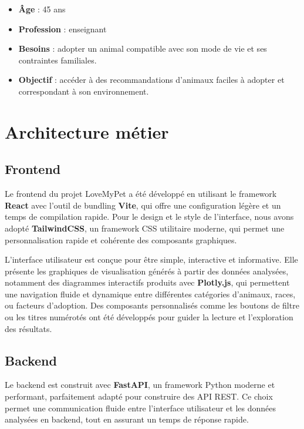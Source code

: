 \documentclass[a4paper,12pt]{article}
\begin{document}
\begin{itemize}
    \item \textbf{Âge} : 45 ans
    \item \textbf{Profession} : enseignant
    \item \textbf{Besoins} : adopter un animal compatible avec son mode de vie et ses contraintes familiales.
    \item \textbf{Objectif} : accéder à des recommandations d’animaux faciles à adopter et correspondant à son environnement.
\end{itemize}

\section {Architecture métier}

\subsection {Frontend}

Le frontend du projet LoveMyPet a été développé en utilisant le framework \textbf{React} avec l’outil de bundling \textbf{Vite}, qui offre une configuration légère et un temps de compilation rapide. Pour le design et le style de l’interface, nous avons adopté \textbf{TailwindCSS}, un framework CSS utilitaire moderne, qui permet une personnalisation rapide et cohérente des composants graphiques.

L’interface utilisateur est conçue pour être simple, interactive et informative. Elle présente les graphiques de visualisation générés à partir des données analysées, notamment des diagrammes interactifs produits avec \textbf{Plotly.js}, qui permettent une navigation fluide et dynamique entre différentes catégories d’animaux, races, ou facteurs d’adoption. Des composants personnalisés comme les boutons de filtre ou les titres numérotés ont été développés pour guider la lecture et l’exploration des résultats.

\subsection {Backend}

Le backend est construit avec \textbf{FastAPI}, un framework Python moderne et performant, parfaitement adapté pour construire des API REST. Ce choix permet une communication fluide entre l’interface utilisateur et les données analysées en backend, tout en assurant un temps de réponse rapide.
\end{document}
